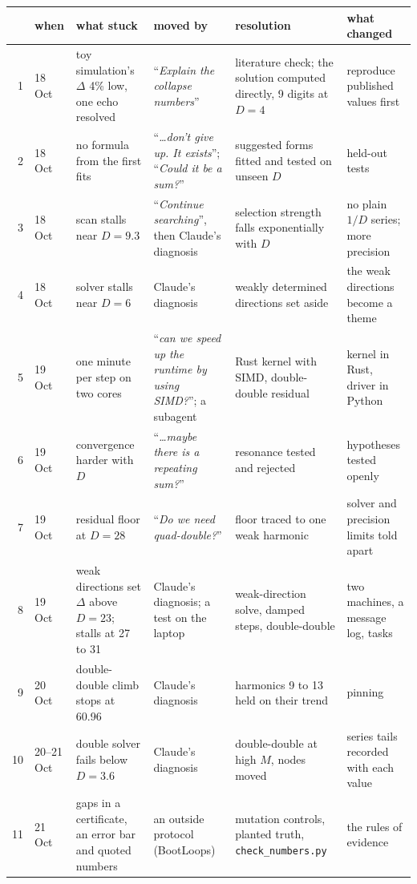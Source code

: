 \documentclass[aps,prd,onecolumn,superscriptaddress,nofootinbib,10pt]{revtex4-2}
\newcommand{\file}[1]{\texttt{#1}}
\newcommand{\prompt}[1]{``\textit{#1}''}
\begin{document}
\begin{center}
\scriptsize
\setlength{\tabcolsep}{3.5pt}
\begin{tabular}{rL{1.05cm}L{3.5cm}L{3.9cm}L{3.6cm}L{3.3cm}}
\toprule
& when & what stuck & moved by & resolution & what changed\\
 & 18 Oct & toy simulation's $\Delta$ 4\% low, one echo resolved & \prompt{Explain the collapse numbers} & literature check; the solution computed directly, 9 digits at $D = 4$ & reproduce published values first\\
2 & 18 Oct & no formula from the first fits & \prompt{\dots don't give up. It exists}; \prompt{Could it be a sum?} & suggested forms fitted and tested on unseen $D$ & held-out tests\\
3 & 18 Oct & scan stalls near $D = 9.3$ & \prompt{Continue searching}, then Claude's diagnosis & selection strength falls exponentially with $D$ & no plain $1/D$ series; more precision\\
4 & 18 Oct & solver stalls near $D = 6$ & Claude's diagnosis & weakly determined directions set aside & the weak directions become a theme\\
5 & 19 Oct & one minute per step on two cores & \prompt{can we speed up the runtime by using SIMD?}; a subagent & Rust kernel with SIMD, double-double residual & kernel in Rust, driver in Python\\
6 & 19 Oct & convergence harder with $D$ & \prompt{\dots maybe there is a repeating sum?} & resonance tested and rejected & hypotheses tested openly\\
7 & 19 Oct & residual floor at $D = 28$ & \prompt{Do we need quad-double?} & floor traced to one weak harmonic & solver and precision limits told apart\\
8 & 19 Oct & weak directions set $\Delta$ above $D = 23$; stalls at 27 to 31 & Claude's diagnosis; a test on the laptop & weak-direction solve, damped steps, double-double & two machines, a message log, tasks\\
9 & 20 Oct & double-double climb stops at 60.96 & Claude's diagnosis & harmonics 9 to 13 held on their trend & pinning\\
10 & 20--21 Oct & double solver fails below $D = 3.6$ & Claude's diagnosis & double-double at high $M$, nodes moved & series tails recorded with each value\\
11 & 21 Oct & gaps in a certificate, an error bar and quoted numbers & an outside protocol (BootLoops) & mutation controls, planted truth, \file{check\_numbers.py} & the rules of evidence\\

\end{tabular}
\end{center}
\end{document}
